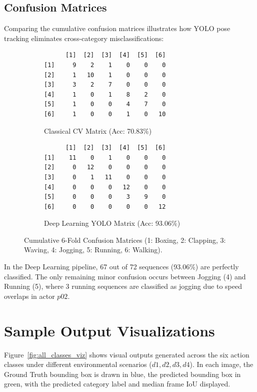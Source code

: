 \documentclass[11pt,a4paper]{article}
\begin{document}
\subsection{Confusion Matrices}
Comparing the cumulative confusion matrices illustrates how YOLO pose tracking eliminates cross-category misclassifications:

\begin{figure}[H]
\centering
\begin{subfigure}[b]{0.48\textwidth}
\centering
\begin{verbatim}
      [1]  [2]  [3]  [4]  [5]  [6]
[1]     9    2    1    0    0    0
[2]     1   10    1    0    0    0
[3]     3    2    7    0    0    0
[4]     1    0    1    8    2    0
[5]     1    0    0    4    7    0
[6]     1    0    0    1    0   10
\end{verbatim}
\caption{Classical CV Matrix (Acc: 70.83\%)}
\end{subfigure}
\hfill
\begin{subfigure}[b]{0.48\textwidth}
\centering
\begin{verbatim}
      [1]  [2]  [3]  [4]  [5]  [6]
[1]    11    0    1    0    0    0
[2]     0   12    0    0    0    0
[3]     0    1   11    0    0    0
[4]     0    0    0   12    0    0
[5]     0    0    0    3    9    0
[6]     0    0    0    0    0   12
\end{verbatim}
\caption{Deep Learning YOLO Matrix (Acc: 93.06\%)}
\end{subfigure}
\caption{Cumulative 6-Fold Confusion Matrices (1: Boxing, 2: Clapping, 3: Waving, 4: Jogging, 5: Running, 6: Walking).}
\label{fig:confusion_matrices}
\end{figure}

In the Deep Learning pipeline, 67 out of 72 sequences (93.06\%) are perfectly classified. The only remaining minor confusion occurs between Jogging (4) and Running (5), where 3 running sequences are classified as jogging due to speed overlaps in actor $p02$.

\section{Sample Output Visualizations}
Figure~\ref{fig:all_classes_viz} shows visual outputs generated across the six action classes under different environmental scenarios ($d1, d2, d3, d4$). In each image, the Ground Truth bounding box is drawn in blue, the predicted bounding box in green, with the predicted category label and median frame IoU displayed.
\end{document}
